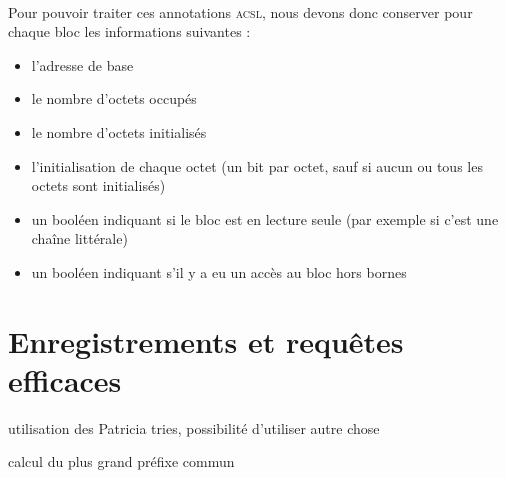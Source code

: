 ~\\
Pour pouvoir traiter ces annotations \textsc{acsl}, nous devons donc conserver
pour chaque bloc les informations suivantes :
\begin{itemize}
\item l'adresse de base
\item le nombre d'octets occupés
\item le nombre d'octets initialisés
\item l'initialisation de chaque octet (un bit par octet, sauf si aucun ou tous
  les octets sont initialisés)
\item un booléen indiquant si le bloc est en lecture seule (par exemple si c'est
  une chaîne littérale)
\item un booléen indiquant s'il y a eu un accès au bloc hors bornes
\end{itemize}







\section{Enregistrements et requêtes efficaces}

utilisation des Patricia tries, possibilité d'utiliser autre chose

calcul du plus grand préfixe commun


